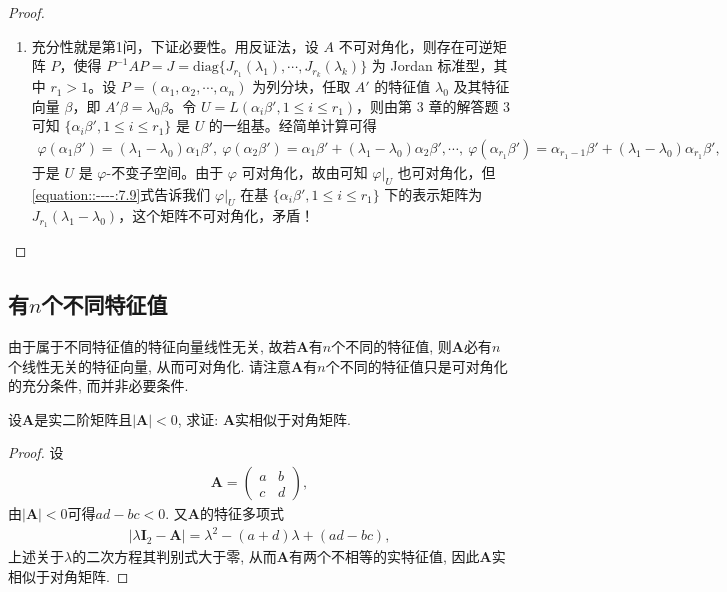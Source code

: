 \documentclass[../../main.tex]{subfiles}
\begin{document}
\begin{proof}
\begin{enumerate}
\item 充分性就是第1问，下证必要性。用反证法，设 $A$ 不可对角化，则存在可逆矩阵 $P$，使得 $P^{-1}AP = J = \mathrm{diag}\{J_{r_1}(\lambda_1),\cdots,J_{r_k}(\lambda_k)\}$ 为 Jordan 标准型，其中 $r_1 > 1$。设 $P = (\alpha_1,\alpha_2,\cdots,\alpha_n)$ 为列分块，任取 $A'$ 的特征值 $\lambda_0$ 及其特征向量 $\beta$，即 $A'\beta = \lambda_0\beta$。令 $U = L(\alpha_i\beta',1\leqslant  i\leqslant  r_1)$，则由第 3 章的解答题 3 可知 $\{\alpha_i\beta',1\leqslant  i\leqslant  r_1\}$ 是 $U$ 的一组基。经简单计算可得
\begin{align}\label{equation::----:7.9}
\varphi(\alpha_1\beta')=(\lambda_1 - \lambda_0)\alpha_1\beta',\ \varphi(\alpha_2\beta')=\alpha_1\beta' + (\lambda_1 - \lambda_0)\alpha_2\beta',\cdots,\ \varphi(\alpha_{r_1}\beta')=\alpha_{r_1 - 1}\beta' + (\lambda_1 - \lambda_0)\alpha_{r_1}\beta',
\end{align}
于是 $U$ 是 $\varphi$-不变子空间。由于 $\varphi$ 可对角化，故由可知 $\varphi|_U$ 也可对角化，但\eqref{equation::----:7.9}式告诉我们 $\varphi|_U$ 在基 $\{\alpha_i\beta',1\leqslant  i\leqslant  r_1\}$ 下的表示矩阵为 $J_{r_1}(\lambda_1 - \lambda_0)$，这个矩阵不可对角化，矛盾！
\end{enumerate}
\end{proof}

\subsection{有$n$个不同特征值}

由于属于不同特征值的特征向量线性无关, 故若$\boldsymbol{A}$有$n$个不同的特征值, 则$\boldsymbol{A}$必有$n$个线性无关的特征向量, 从而可对角化. 请注意$\boldsymbol{A}$有$n$个不同的特征值只是可对角化的充分条件, 而并非必要条件. 

\begin{example}
设$\boldsymbol{A}$是实二阶矩阵且$|\boldsymbol{A}|< 0$, 求证: $\boldsymbol{A}$实相似于对角矩阵.
\end{example}
\begin{proof}
设
\begin{align*}
\boldsymbol{A}=\begin{pmatrix}
a&b\\
c&d
\end{pmatrix},
\end{align*}
由$|\boldsymbol{A}|< 0$可得$ad - bc< 0$. 又$\boldsymbol{A}$的特征多项式
\begin{align*}
|\lambda\boldsymbol{I}_2-\boldsymbol{A}|=\lambda^2-(a + d)\lambda+(ad - bc),
\end{align*}
上述关于$\lambda$的二次方程其判别式大于零, 从而$\boldsymbol{A}$有两个不相等的实特征值, 因此$\boldsymbol{A}$实相似于对角矩阵.
\end{proof}
\end{document}
